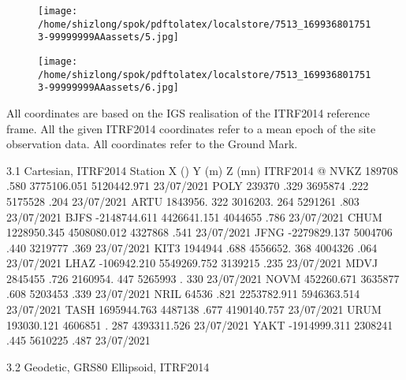 \documentclass[a4paper,12pt]{article}
\begin{document}
\vspace{10pt}

\par

\vspace{10pt}

\begin{figure}[h]

\texttt{[image: /home/shizlong/spok/pdftolatex/localstore/7513\_1699368017513-99999999AAassets/5.jpg]}

\centering

\end{figure}

\begin{figure}[h]

\texttt{[image: /home/shizlong/spok/pdftolatex/localstore/7513\_1699368017513-99999999AAassets/6.jpg]}

\centering

\end{figure}

    All coordinates are based on the IGS realisation of the ITRF2014 reference frame. All  the given ITRF2014 coordinates refer to a mean epoch of the site observation data. All  coordinates refer to the Ground Mark. 

\vspace{10pt}

    3.1 Cartesian, ITRF2014                        Station X () Y (m) Z (mn) ITRF2014 @  NVKZ 189708 .580 3775106.051 5120442.971 23/07/2021  POLY 239370 .329 3695874 .222 5175528 .204 23/07/2021  ARTU 1843956. 322 3016203. 264 5291261 .803 23/07/2021  BJFS -2148744.611 4426641.151 4044655 .786 23/07/2021  CHUM 1228950.345 4508080.012 4327868 .541 23/07/2021  JFNG -2279829.137 5004706 .440 3219777 .369 23/07/2021  KIT3 1944944 .688 4556652. 368 4004326 .064 23/07/2021  LHAZ -106942.210 5549269.752 3139215 .235 23/07/2021  MDVJ 2845455 .726 2160954. 447 5265993 . 330 23/07/2021  NOVM 452260.671 3635877 .608 5203453 .339 23/07/2021  NRIL 64536 .821 2253782.911 5946363.514 23/07/2021  TASH 1695944.763 4487138 .677 4190140.757 23/07/2021  URUM 193030.121 4606851 . 287 4393311.526 23/07/2021  YAKT -1914999.311 2308241 .445 5610225 .487 23/07/2021     

\vspace{10pt}

    3.2 Geodetic, GRS80 Ellipsoid, ITRF2014 

\vspace{10pt}
\end{document}
